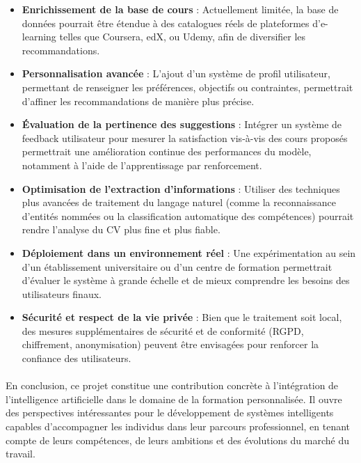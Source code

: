 \begin{itemize}
    \item \textbf{Enrichissement de la base de cours} : Actuellement limitée, la base de données pourrait être étendue à des catalogues réels de plateformes d’e-learning telles que Coursera, edX, ou Udemy, afin de diversifier les recommandations.
    
    \item \textbf{Personnalisation avancée} : L’ajout d’un système de profil utilisateur, permettant de renseigner les préférences, objectifs ou contraintes, permettrait d’affiner les recommandations de manière plus précise.
    
    \item \textbf{Évaluation de la pertinence des suggestions} : Intégrer un système de feedback utilisateur pour mesurer la satisfaction vis-à-vis des cours proposés permettrait une amélioration continue des performances du modèle, notamment à l’aide de l’apprentissage par renforcement.
    
    \item \textbf{Optimisation de l’extraction d’informations} : Utiliser des techniques plus avancées de traitement du langage naturel (comme la reconnaissance d’entités nommées ou la classification automatique des compétences) pourrait rendre l’analyse du CV plus fine et plus fiable.
    
    \item \textbf{Déploiement dans un environnement réel} : Une expérimentation au sein d’un établissement universitaire ou d’un centre de formation permettrait d’évaluer le système à grande échelle et de mieux comprendre les besoins des utilisateurs finaux.
    
    \item \textbf{Sécurité et respect de la vie privée} : Bien que le traitement soit local, des mesures supplémentaires de sécurité et de conformité (RGPD, chiffrement, anonymisation) peuvent être envisagées pour renforcer la confiance des utilisateurs.
\end{itemize}

\bigskip
\paragraph{}
En conclusion, ce projet constitue une contribution concrète à l’intégration de l’intelligence artificielle dans le domaine de la formation personnalisée. Il ouvre des perspectives intéressantes pour le développement de systèmes intelligents capables d’accompagner les individus dans leur parcours professionnel, en tenant compte de leurs compétences, de leurs ambitions et des évolutions du marché du travail.
